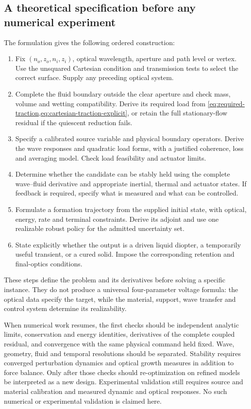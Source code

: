 \subsection{A theoretical specification before any numerical experiment}
The formulation gives the following ordered construction:
\begin{enumerate}
\item Fix $(n_o,z_o,n_i,z_i)$, optical wavelength, aperture and path level or
vertex. Use the unsquared Cartesian condition and transmission tests to select
the correct surface. Supply any preceding optical system.
\item Complete the fluid boundary outside the clear aperture and check mass,
volume and wetting compatibility. Derive its required load from
\cref{eq:required-traction,eq:cartesian-traction-explicit}, or retain the full
stationary-flow residual if the quiescent reduction fails.
\item Specify a calibrated source variable and physical boundary operators.
Derive the wave responses and quadratic load forms, with a justified coherence,
loss and averaging model. Check load feasibility and actuator limits.
\item Determine whether the candidate can be stably held using the complete
wave--fluid derivative and appropriate inertial, thermal and actuator states.
If feedback is required, specify what is measured and what can be controlled.
\item Formulate a formation trajectory from the supplied initial state, with
optical, energy, rate and terminal constraints. Derive its adjoint and use one
realizable robust policy for the admitted uncertainty set.
\item State explicitly whether the output is a driven liquid diopter, a
temporarily useful transient, or a cured solid. Impose the corresponding
retention and final-optics conditions.
\end{enumerate}
These steps define the problem and its derivatives before solving a specific
instance. They do not produce a universal four-parameter voltage formula:
the optical data specify the target, while the material, support, wave
transfer and control system determine its realizability.

When numerical work resumes, the first checks should be independent analytic
limits, conservation and energy identities, derivatives of the complete
coupled residual, and convergence with the same physical command held fixed.
Wave, geometry, fluid and temporal resolutions should be separated. Stability
requires converged perturbation dynamics and optical growth measures in
addition to force balance. Only after those checks should re-optimization on
refined models be interpreted as a new design. Experimental validation still
requires source and material calibration and measured dynamic and optical
responses. No such numerical or experimental validation is claimed here.
